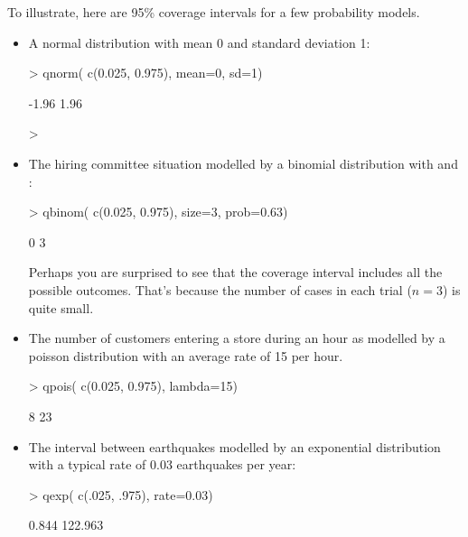 To illustrate, here are 95\% coverage intervals for a few
probability models. 
\begin{itemize}
\item A normal distribution with mean 0 and standard deviation 1:
\begin{Schunk}
\begin{Sinput}
> qnorm( c(0.025, 0.975), mean=0, sd=1)
\end{Sinput}
\begin{Soutput}
[1] -1.96  1.96
\end{Soutput}
\end{Schunk}
> 

\item The hiring committee situation modelled by a binomial
distribution with  and :
\begin{Schunk}
\begin{Sinput}
> qbinom( c(0.025, 0.975), size=3, prob=0.63)
\end{Sinput}
\begin{Soutput}
[1] 0 3
\end{Soutput}
\end{Schunk}

Perhaps you are surprised to see that the coverage interval includes
all the possible outcomes.  That's because the number of cases in each
trial ($n=3$) is quite small. 

\item The number of customers entering a store during an hour 
as modelled by a poisson
distribution with an average rate of 15 per hour.
\begin{Schunk}
\begin{Sinput}
> qpois( c(0.025, 0.975), lambda=15)
\end{Sinput}
\begin{Soutput}
[1]  8 23
\end{Soutput}
\end{Schunk}

\item The interval between earthquakes modelled by an exponential
distribution with a typical rate of 0.03 earthquakes per year:
\begin{Schunk}
\begin{Sinput}
> qexp( c(.025, .975), rate=0.03)
\end{Sinput}
\begin{Soutput}
[1]   0.844 122.963
\end{Soutput}
\end{Schunk}
\end{itemize}

